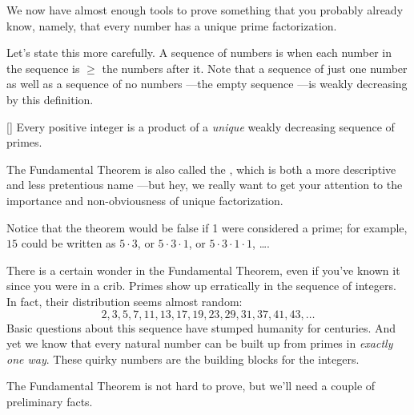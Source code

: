 We now have almost enough tools to prove something that you probably
already know, namely, that every number has a unique prime
factorization.  

Let's state this more carefully.  A sequence of numbers is
\emph{} when each number in the sequence is
$\ge$ the numbers after it.  Note that a sequence of just one number
as well as a sequence of no numbers ---the empty sequence ---is weakly
decreasing by this definition.

\begin{theorem}\label{thm:unique_factor}[]
Every positive integer is a product of a \emph{unique} weakly decreasing
  sequence of primes.
\end{theorem}

The Fundamental Theorem is also called the , which is both a more descriptive and less pretentious name
---but hey, we really want to get your attention to the importance and
non-obviousness of unique factorization.

Notice that the theorem would be false if 1 were considered a prime;
for example, $15$ could be written as $5 \cdot 3$, or $5 \cdot 3 \cdot
1$, or $5 \cdot 3 \cdot 1 \cdot 1$, \dots.

There is a certain wonder in the Fundamental Theorem, even if you've
known it since you were in a crib.  Primes show up erratically in the
sequence of integers.  In fact, their distribution seems almost
random:
\[
2, 3, 5, 7, 11, 13, 17, 19, 23, 29, 31, 37, 41, 43, \dots
\]
Basic questions about this sequence have stumped humanity for
centuries.  And yet we know that every natural number can be built up
from primes in \emph{exactly one way}.  These quirky numbers are the
building blocks for the integers.

The Fundamental Theorem is not hard to prove, but we'll need a couple
of preliminary facts.

